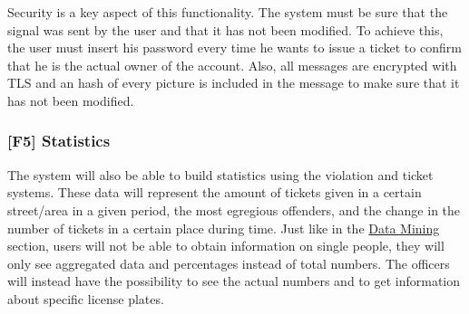 Security is a key aspect of this functionality. The system must be sure that the signal was sent by the user and that it has not been modified.
To achieve this, the user must insert his password every time he wants to issue a ticket to confirm that he is the actual owner of the account.
Also, all messages are encrypted with TLS and an hash of every picture is included in the message to make sure that it has not been modified.

\subsubsection[]{[F5] Statistics\hypertarget{sec:f5}{}}
The system will also be able to build statistics using the violation and ticket systems.
These data will represent the amount of tickets given in a certain street/area in a given period, the most egregious offenders, and the change in the number of tickets in a certain place during time.
Just like in the
\hyperlink{sec:f2}{Data Mining}
section, users will not be able to obtain information on single people, they will only see aggregated data and percentages instead of total numbers.
The officers will instead have the possibility to see the actual numbers and to get information about specific license plates.
